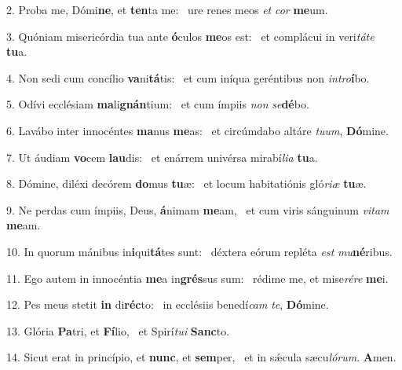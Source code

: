 2. Proba me, Dómi\textbf{ne}, et \textbf{ten}ta me: \ast\  ure renes meos \textit{et} \textit{cor} \textbf{me}um.\

3. Quóniam misericórdia tua ante \textbf{ó}culos \textbf{me}os est: \ast\  et complácui in veri\textit{tá}\textit{te} \textbf{tu}a.\

4. Non sedi cum concílio \textbf{va}ni\textbf{tá}tis: \ast\  et cum iníqua geréntibus non \textit{in}\textit{tro}\textbf{í}bo.\

5. Odívi ecclésiam \textbf{ma}li\textbf{gnán}tium: \ast\  et cum ímpiis \textit{non} \textit{se}\textbf{dé}bo.\

6. Lavábo inter innocéntes \textbf{ma}nus \textbf{me}as: \ast\  et circúmdabo altáre \textit{tu}\textit{um}, \textbf{Dó}mine.\

7. Ut áudiam \textbf{vo}cem \textbf{lau}dis: \ast\  et enárrem univérsa mirabí\textit{li}\textit{a} \textbf{tu}a.\

8. Dómine, diléxi decórem \textbf{do}mus \textbf{tu}æ: \ast\  et locum habitatiónis gló\textit{ri}\textit{æ} \textbf{tu}æ.\

9. Ne perdas cum ímpiis, Deus, \textbf{á}nimam \textbf{me}am, \ast\  et cum viris sánguinum \textit{vi}\textit{tam} \textbf{me}am.\

10. In quorum mánibus in\textbf{i}qui\textbf{tá}tes sunt: \ast\  déxtera eórum repléta \textit{est} \textit{mu}\textbf{né}ribus.\

11. Ego autem in innocéntia \textbf{me}a in\textbf{grés}sus sum: \ast\  rédime me, et mise\textit{ré}\textit{re} \textbf{me}i.\

12. Pes meus stetit \textbf{in} di\textbf{réc}to: \ast\  in ecclésiis benedí\textit{cam} \textit{te}, \textbf{Dó}mine.\

13. Glória \textbf{Pa}tri, et \textbf{Fí}lio, \ast\  et Spirí\textit{tu}\textit{i} \textbf{Sanc}to.\

14. Sicut erat in princípio, et \textbf{nunc}, et \textbf{sem}per, \ast\  et in sǽcula sæcu\textit{ló}\textit{rum}. \textbf{A}men.\

